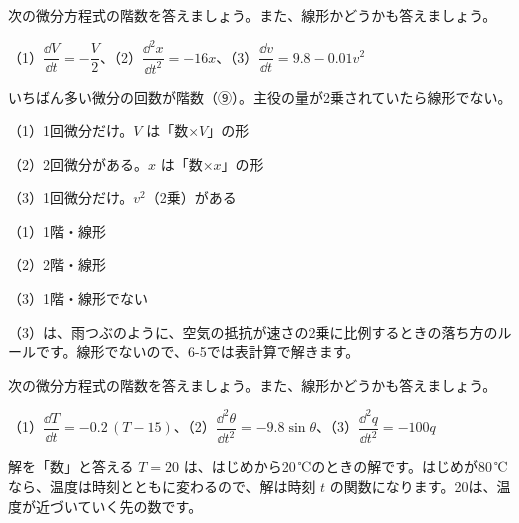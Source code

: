 \begin{reidai}[階数と線形を見分ける]
次の微分方程式の階数を答えましょう。また、線形かどうかも答えましょう。\par
\quad （1）$\dfrac{\dd V}{\dd t}=-\dfrac{V}{2}$、（2）$\dfrac{\dd^2x}{\dd t^2}=-16x$、（3）$\dfrac{\dd v}{\dd t}=9.8-0.01v^2$\par
\kangaekata いちばん多い微分の回数が階数（⑨）。主役の量が2乗されていたら線形でない。\par
\shiki （1）1回微分だけ。$V$ は「数×$V$」の形\par
\hspace*{2.6\zw}（2）2回微分がある。$x$ は「数×$x$」の形\par
\hspace*{2.6\zw}（3）1回微分だけ。$v^2$（2乗）がある\par
\kotae （1）1階・線形\par
\hspace*{3.2\zw}（2）2階・線形\par
\hspace*{3.2\zw}（3）1階・線形でない
\end{reidai}
（3）は、雨つぶのように、空気の抵抗が速さの2乗に比例するときの落ち方のルールです。線形でないので、6-5では表計算で解きます。

\begin{jibun}
次の微分方程式の階数を答えましょう。また、線形かどうかも答えましょう。\par
\quad （1）$\dfrac{\dd T}{\dd t}=-0.2\,(T-15)$、（2）$\dfrac{\dd^2\theta}{\dd t^2}=-9.8\sin\theta$、（3）$\dfrac{\dd^2q}{\dd t^2}=-100q$
\end{jibun}


\begin{tsumazuki}{解を「数」と答える}
$T=20$ は、はじめから20\,℃のときの解です。はじめが80\,℃なら、温度は時刻とともに変わるので、解は時刻 $t$ の関数になります。20は、温度が近づいていく先の数です。
\end{tsumazuki}

